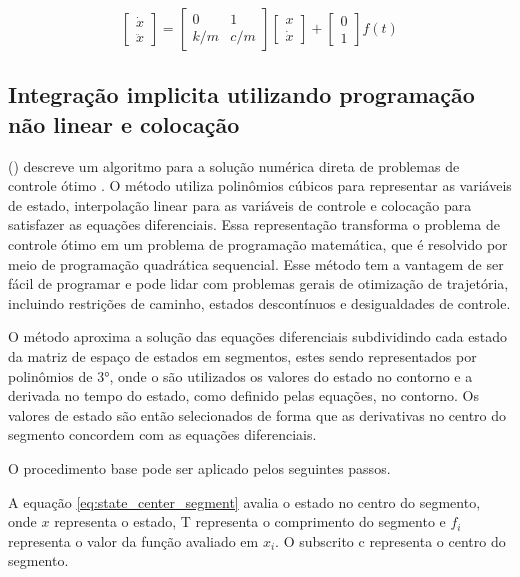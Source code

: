 \begin{equation}
    \label{eq:espaco_de_estados_ex}
    \begin{bmatrix}
        \dot x \\
        \ddot x
    \end{bmatrix}
    =
    \begin{bmatrix}
        0 & 1 \\
        k/m & c/m
    \end{bmatrix}
    \begin{bmatrix}
        x \\
        \dot x
    \end{bmatrix}
    +
    \begin{bmatrix}
        0 \\
        1
    \end{bmatrix}
    f(t)
\end{equation}

\subsection{Integração implicita utilizando programação não linear e colocação}

\citeauthor{hargraves87} (\citeyear{hargraves87}) descreve um algoritmo para a solução numérica direta de problemas de controle ótimo \cite{hargraves87}. 
O método utiliza polinômios cúbicos para representar as variáveis de estado, interpolação linear para as 
variáveis de controle e colocação para satisfazer as equações diferenciais. 
Essa representação transforma o problema de controle ótimo em um problema de programação matemática, 
que é resolvido por meio de programação quadrática sequencial. 
Esse método tem a vantagem de ser fácil de programar e pode lidar com problemas gerais de otimização 
de trajetória, incluindo restrições de caminho, estados descontínuos e desigualdades de controle.

O método aproxima a solução das equações diferenciais subdividindo cada estado da matriz de espaço de estados
em segmentos, estes sendo representados por polinômios de 3°, onde o são utilizados os valores do estado no
contorno e a derivada no tempo do estado, como definido pelas equações, no contorno.
Os valores de estado são então selecionados de forma que as derivativas no centro do segmento concordem com
as equações diferenciais.

O procedimento base pode ser aplicado pelos seguintes passos.

A equação \ref{eq:state_center_segment} avalia o estado no centro do segmento, onde $x$ representa o estado, 
T representa o comprimento do segmento e $f_i$ representa o valor da função avaliado em $x_i$.
O subscrito c representa o centro do segmento.


